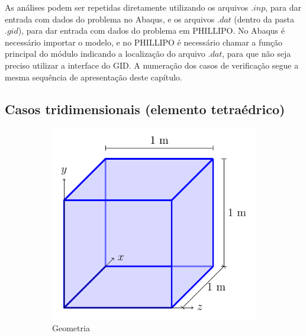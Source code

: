As análises podem ser repetidas diretamente utilizando os arquivos $.inp$, para dar entrada com dados do problema no Abaqus, e os arquivos $.dat$ (dentro da pasta $.gid$), para dar entrada com dados do problema em PHILLIPO. No Abaqus é necessário importar o modelo, e no PHILLIPO é necessário chamar a função principal do módulo indicando a localização do arquivo $.dat$, para que não seja preciso utilizar a interface do GID. A numeração dos casos de verificação segue a mesma sequência de apresentação deste capítulo.

\subsection{Casos tridimensionais (elemento tetraédrico)}

\begin{figure}
    \centering
    \caption{O cubo unitário.}
    \begin{subfigure}[b]{0.45\textwidth}
        \centering
        \includegraphics[page=1]{Figuras/verificacao_cubo.pdf}
        \caption{Geometria}
        \label{fig:verificacao_cubo_1}
    \end{subfigure}
    \begin{subfigure}[b]{0.45\textwidth}
        \centering

\end{subfigure}
\end{figure}
